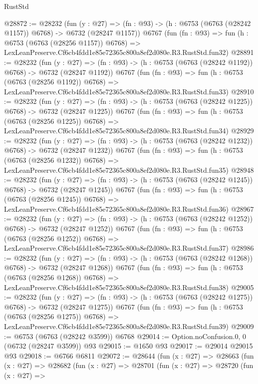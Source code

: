 \begin{lexlean}{RustStd}
\begin{coremodule}
@28872 := @28232
    (fun (y : @27) =>
    (fn : @93) -> (h : @6753 (@6763 (@28242 @1157)) @6768) -> @6732 (@28247 @1157))
    @6767
    (fun (fn : @93) =>
    fun (h : @6753 (@6763 (@28256 @1157)) @6768) =>
    LexLeanPreserve.Cf6cb4fdd1e85e72365c800a8ef2d080e.R3.RustStd.fun32)
@28891 := @28232
    (fun (y : @27) =>
    (fn : @93) -> (h : @6753 (@6763 (@28242 @1192)) @6768) -> @6732 (@28247 @1192))
    @6767
    (fun (fn : @93) =>
    fun (h : @6753 (@6763 (@28256 @1192)) @6768) =>
    LexLeanPreserve.Cf6cb4fdd1e85e72365c800a8ef2d080e.R3.RustStd.fun33)
@28910 := @28232
    (fun (y : @27) =>
    (fn : @93) -> (h : @6753 (@6763 (@28242 @1225)) @6768) -> @6732 (@28247 @1225))
    @6767
    (fun (fn : @93) =>
    fun (h : @6753 (@6763 (@28256 @1225)) @6768) =>
    LexLeanPreserve.Cf6cb4fdd1e85e72365c800a8ef2d080e.R3.RustStd.fun34)
@28929 := @28232
    (fun (y : @27) =>
    (fn : @93) -> (h : @6753 (@6763 (@28242 @1232)) @6768) -> @6732 (@28247 @1232))
    @6767
    (fun (fn : @93) =>
    fun (h : @6753 (@6763 (@28256 @1232)) @6768) =>
    LexLeanPreserve.Cf6cb4fdd1e85e72365c800a8ef2d080e.R3.RustStd.fun35)
@28948 := @28232
    (fun (y : @27) =>
    (fn : @93) -> (h : @6753 (@6763 (@28242 @1245)) @6768) -> @6732 (@28247 @1245))
    @6767
    (fun (fn : @93) =>
    fun (h : @6753 (@6763 (@28256 @1245)) @6768) =>
    LexLeanPreserve.Cf6cb4fdd1e85e72365c800a8ef2d080e.R3.RustStd.fun36)
@28967 := @28232
    (fun (y : @27) =>
    (fn : @93) -> (h : @6753 (@6763 (@28242 @1252)) @6768) -> @6732 (@28247 @1252))
    @6767
    (fun (fn : @93) =>
    fun (h : @6753 (@6763 (@28256 @1252)) @6768) =>
    LexLeanPreserve.Cf6cb4fdd1e85e72365c800a8ef2d080e.R3.RustStd.fun37)
@28986 := @28232
    (fun (y : @27) =>
    (fn : @93) -> (h : @6753 (@6763 (@28242 @1268)) @6768) -> @6732 (@28247 @1268))
    @6767
    (fun (fn : @93) =>
    fun (h : @6753 (@6763 (@28256 @1268)) @6768) =>
    LexLeanPreserve.Cf6cb4fdd1e85e72365c800a8ef2d080e.R3.RustStd.fun38)
@29005 := @28232
    (fun (y : @27) =>
    (fn : @93) -> (h : @6753 (@6763 (@28242 @1275)) @6768) -> @6732 (@28247 @1275))
    @6767
    (fun (fn : @93) =>
    fun (h : @6753 (@6763 (@28256 @1275)) @6768) =>
    LexLeanPreserve.Cf6cb4fdd1e85e72365c800a8ef2d080e.R3.RustStd.fun39)
@29009 := @6753 (@6763 (@28242 @3599)) @6768
@29014 := Option.noConfusion.{0, 0} (@6732 (@28247 @3599)) @93
@29015 := @1650 @93
@29017 := @29014 @29015 @93
@29018 := @6766 @6811
@29072 := @28644
    (fun (x : @27) =>
    @28663
      (fun (x : @27) =>
      @28682
        (fun (x : @27) =>
        @28701
          (fun (x : @27) =>
          @28720
            (fun (x : @27) =>

\end{coremodule}
\end{lexlean}
